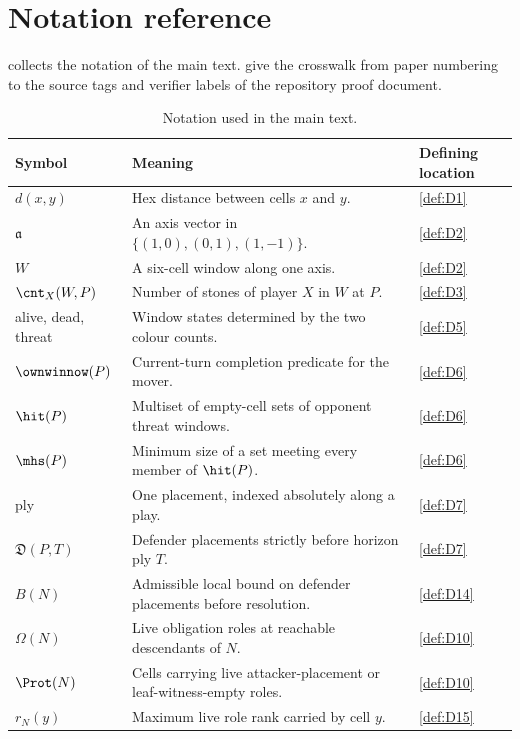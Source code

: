 \section{Notation reference}
\label{sec:notation}

 collects the notation of the main text.
 give the crosswalk
from paper numbering to the source tags and verifier labels of the
repository proof document.

\begin{table}[!htbp]
  \centering
  \caption{Notation used in the main text.}
  \label{tab:notation}
  \renewcommand{\arraystretch}{1.08}
  \begin{tabular}{@{}p{}p{}p{}@{}}
    \toprule
    Symbol & Meaning & Defining location \\
    \midrule
    $d(x,y)$ & Hex distance between cells $x$ and $y$. & \cref{def:D1} \\
    $\mathfrak a$ & An axis vector in $\{(1,0),(0,1),(1,-1)\}$. & \cref{def:D2} \\
    $W$ & A six-cell window along one axis. & \cref{def:D2} \\
    $\cnt_X(W,P)$ & Number of stones of player $X$ in $W$ at $P$. & \cref{def:D3} \\
    alive, dead, threat & Window states determined by the two colour counts. & \cref{def:D5} \\
    $\ownwinnow(P)$ & Current-turn completion predicate for the mover. & \cref{def:D6} \\
    $\hit(P)$ & Multiset of empty-cell sets of opponent threat windows. & \cref{def:D6} \\
    $\mhs(P)$ & Minimum size of a set meeting every member of $\hit(P)$. & \cref{def:D6} \\
    ply & One placement, indexed absolutely along a play. & \cref{def:D7} \\
    $\mathfrak D(P,T)$ & Defender placements strictly before horizon ply $T$. & \cref{def:D7} \\
    $B(N)$ & Admissible local bound on defender placements before resolution. & \cref{def:D14} \\
    $\Omega(N)$ & Live obligation roles at reachable descendants of $N$. & \cref{def:D10} \\
    $\Prot(N)$ & Cells carrying live attacker-placement or leaf-witness-empty roles. & \cref{def:D10} \\
    $r_N(y)$ & Maximum live role rank carried by cell $y$. & \cref{def:D15} \\

\end{tabular}
\end{table}
